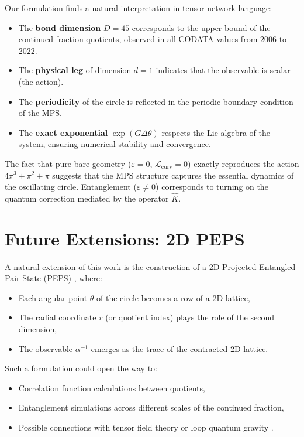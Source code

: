 \documentclass[12pt]{article}
\begin{document}
Our formulation finds a natural interpretation in tensor network language:

\begin{itemize}
    \item The \textbf{bond dimension} $D = 45$ corresponds to the upper bound of the
    continued fraction quotients, observed in all CODATA values from 2006 to 2022.
    \item The \textbf{physical leg} of dimension $d = 1$ indicates that the observable
    is scalar (the action).
    \item The \textbf{periodicity} of the circle is reflected in the periodic boundary
    condition of the MPS.
    \item The \textbf{exact exponential} $\exp(G \Delta\theta)$ respects the Lie algebra
    of the system, ensuring numerical stability and convergence.
\end{itemize}

The fact that pure bare geometry ($\varepsilon = 0$, $\mathcal{L}_{\text{curv}} = 0$)
exactly reproduces the action $4\pi^3 + \pi^2 + \pi$ suggests that the MPS structure
captures the essential dynamics of the oscillating circle. Entanglement
($\varepsilon \neq 0$) corresponds to turning on the quantum correction mediated by
the operator $\hat K$.

\section{Future Extensions: 2D PEPS}

A natural extension of this work is the construction of a 2D Projected Entangled Pair
State (PEPS) \cite{verstraete2004peps,cirac2009,schollwock2011}, where:

\begin{itemize}
    \item Each angular point $\theta$ of the circle becomes a row of a 2D lattice,
    \item The radial coordinate $r$ (or quotient index) plays the role of the second
    dimension,
    \item The observable $\alpha^{-1}$ emerges as the trace of the contracted 2D lattice.
\end{itemize}

Such a formulation could open the way to:
\begin{itemize}
    \item Correlation function calculations between quotients,
    \item Entanglement simulations across different scales of the continued fraction,
    \item Possible connections with tensor field theory \cite{rivasseau2012} or loop
    quantum gravity \cite{rovelli2004}.
\end{itemize}
\end{document}
